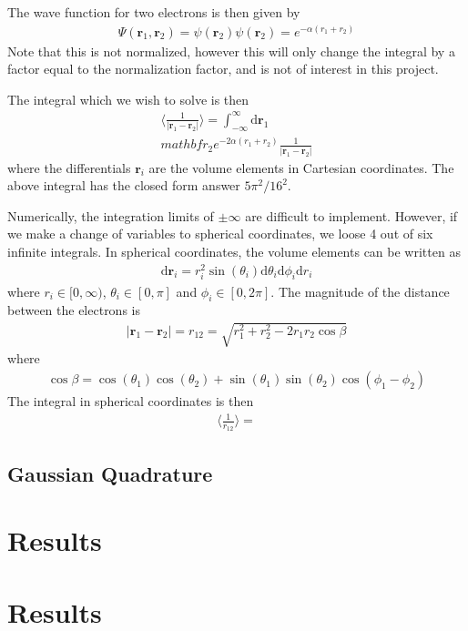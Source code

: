 \documentclass[twoside, 11pt]{article}
\renewcommand{\d}{\mathrm{d}}
\begin{document}
\begin{multicols}{2}
		The wave function for two electrons is then given by
		\begin{align}
			\Psi(\mathbf{r}_1, \mathbf{r}_2) = \psi(\mathbf{r}_2)\psi(\mathbf{r}_2) = e^{-\alpha(r_1 + r_2)}
		\end{align}
		Note that this is not normalized, however this will only change the integral by a factor equal to the normalization factor, and is not of interest in this project.
		
		The integral which we wish to solve is then
		\begin{align}
			\langle \frac{1}{|\mathbf{r}_1 - \mathbf{r}_2|} \rangle = \int_{-\infty}^{\infty} \d\mathbf{r}_1 \\mathbf{r}_2 e^{-2\alpha(r_1+r_2)} \frac{1}{|\mathbf{r}_1 - \mathbf{r}_2|}
		\end{align}
		where the differentials $\mathbf{r}_i$ are the volume elements in Cartesian coordinates. The above integral has the closed form answer $5\pi^2/16^2$.
		
		Numerically, the integration limits of $\pm \infty$ are difficult to implement. However, if we make a change of variables to spherical coordinates, we loose 4 out of six infinite integrals.
		In spherical coordinates, the volume elements can be written as
		\begin{align}
			\d\mathbf{r}_i = r_i^2\sin (\theta_i)\d \theta_i \d \phi_i \d r_i
		\end{align}
		where $r_i \in [0, \infty)$, $\theta_i \in [0, \pi]$ and $\phi_i \in [0, 2\pi]$. The magnitude of the distance between the electrons is 
		\begin{align}
			|\mathbf{r}_1 - \mathbf{r}_2| = r_{12} = \sqrt{r_1^2 + r_2^2 - 2r_1 r_2 \cos \beta}
		\end{align}
		where
		\begin{align}
			\cos\beta = \cos(\theta_1) \cos (\theta_2) + \sin(\theta_1)\sin(\theta_2) \cos(\phi_1 - \phi_2) \nonumber
		\end{align}
		The integral in spherical coordinates is then
		\begin{align}
			\langle \frac{1}{r_{12}} \rangle = 
		\end{align}
	\subsection{Gaussian Quadrature}
		
		

\section{Results}





\section{Results}


%
%


\end{multicols}
\end{document}
